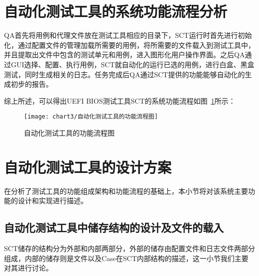 \section{自动化测试工具的系统功能流程分析}
	
	QA首先将用例和代理文件放在测试工具相应的目录下，SCT运行时首先进行初始化，通过配置文件的管理加载所需要的用例，将所需要的文件载入到测试工具中，并且提取出文件中包含的测试单元和用例，进入图形化用户操作界面。之后QA通过GUI选择、配置、执行用例，SCT就自动化的运行已选的用例，进行白盒、黑盒测试，同时生成相关的日志。任务完成后QA通过SCT提供的功能能够自动化的生成初步的报告。
	
	综上所述，可以得出UEFI BIOS测试工具SCT的系统功能流程如图~\ref{fig:自动化测试工具的功能流程图}所示：
	
	\begin{figure}[H] %
		\centering
		\texttt{[image: chart3/自动化测试工具的功能流程图]}
		\caption{自动化测试工具的功能流程图}
		\label{fig:自动化测试工具的功能流程图}
	\end{figure}
	
\section{自动化测试工具的设计方案}
	
	在分析了测试工具的功能组成架构和功能流程的基础上，本小节将对该系统主要功能的设计和实现进行描述。
	
	\subsection{自动化测试工具中储存结构的设计及文件的载入}
		
		SCT储存的结构分为外部和内部两部分，外部的储存由配置文件和日志文件两部分组成，内部的储存则是文件以及Case在SCT内部结构的描述，这一小节我们主要对其进行讨论。
		
